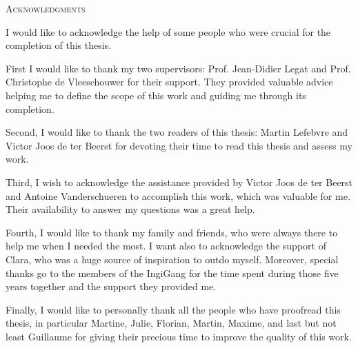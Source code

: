 \vspace*{\fill}
\begin{center}
    \huge{\textsc{Acknowledgments}}
    \end{center}
    
    I would like to acknowledge the help of some people who were crucial for the completion of this thesis.
    
    First I would like to thank my two supervisors: Prof. Jean-Didier Legat and Prof. Christophe de Vleeschouwer for their support. They provided valuable advice helping me to define the scope of this work and guiding me through its completion.
    
    Second, I would like to thank the two readers of this thesis: Martin Lefebvre and Victor Joos de ter Beerst for devoting their time to read this thesis and assess my work.
    
    Third, I wish to acknowledge the assistance provided by Victor Joos de ter Beerst and Antoine Vanderschueren to accomplish this work, which was valuable for me. Their availability to answer my questions was a great help.
    
    Fourth, I would like to thank my family and friends, who were always there to help me when I needed the most. I want also to acknowledge the support of Clara, who was a huge source of inspiration to outdo myself. Moreover, special thanks go to the members of the IngiGang for the time spent during those five years together and the support they provided me.
    
    Finally, I would like to personally thank all the people who have proofread this thesis, in particular Martine, Julie, Florian, Martin, Maxime, and last but not least Guillaume for giving their precious time to improve the quality of this work. 
\vspace*{\fill}
\afterpage{\blankpage}
\newpage
